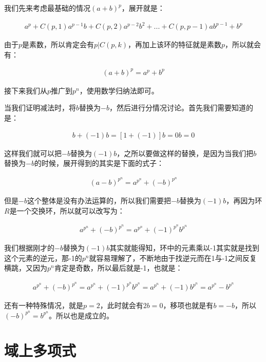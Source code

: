 \documentclass[12pt, a4paper, oneside]{ctexart}
\theoremstyle{definition}
\begin{document}
我们先来考虑最基础的情况$(a+b)^p$，展开就是：

\begin{align*}
a^p+C(p,1)a^{p-1}b+C(p,2)a^{p-2}b^2+...+C(p,p-1)ab^{p-1}+b^p
\end{align*}

由于$p$是素数，所以肯定会有$p|C(p,k)$，再加上该环的特征就是素数$p$，所以就会有：

\begin{align*}
(a+b)^p=a^p+b^p
\end{align*}

接下来我们从$p$推广到$p^n$，使用数学归纳法即可。

当我们证明减法时，将$b$替换为$-b$，然后进行分情况讨论。首先我们需要知道的是：

\begin{align*}
b+(-1)b=[1+(-1)]b=0b=0
\end{align*}

这样我们就可以把$-b$替换为$(-1)b$，之所以要做这样的替换，是因为当我们把$b$替换为$-b$的时候，展开得到的其实是下面的式子：

\begin{align*}
(a-b)^{p^n}=a^{p^n}+(-b)^{p^n}
\end{align*}

但是$-b$这个整体是没有办法运算的，所以我们需要把$-b$替换为$(-1)b$，再因为环$R$是一个交换环，所以就可以改写为：

\begin{align*}
a^{p^n}+(-b)^{p^n}=a^{p^n}+(-1)^{p^n}b^{p^n}
\end{align*}

我们根据刚才的$-b$替换为$(-1)b$其实就能得知，环中的元素乘以-1其实就是找到这个元素的逆元，那-1的$p^n$就容易理解了，不断地由于找逆元而在1与-1之间反复横跳，又因为$p^n$肯定是奇数，所以最后就是-1，也就是：

\begin{align*}
a^{p^n}+(-b)^{p^n}=a^{p^n}+(-1)^{p^n}b^{p^n}=a^{p^n}+(-1)b^{p^n}=a^{p^n}-b^{p^n}
\end{align*}

还有一种特殊情况，就是$p=2$，此时就会有$2b=0$，移项也就是有$b=-b$，所以$(-b)^{p^n}=b^{p^n}$。所以也是成立的。

\section*{域上多项式}
\end{document}
